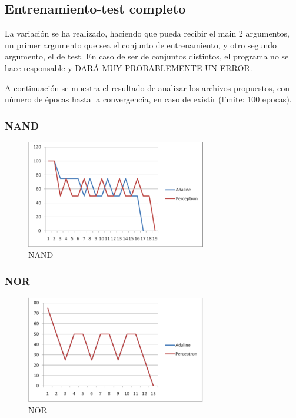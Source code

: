 \documentclass[12pt]{article}
\begin{document}
\subsection{Entrenamiento-test completo}
La variación se ha realizado, haciendo que pueda recibir el main 2 argumentos, un primer argumento que sea el conjunto de entrenamiento, y otro segundo argumento, el de test. En caso de ser de conjuntos distintos, el programa no se hace responsable y DARÁ MUY PROBABLEMENTE UN ERROR.

A continuación se muestra el resultado de analizar los archivos propuestos, con número de épocas hasta la convergencia, en caso de existir (límite: 100 epocas).

\newpage
\subsubsection*{NAND}
\begin{figure}[h!]
    \label{fig:fig3}
  \centering
       \includegraphics[width=0.7\textwidth]{recursos/fig3}
    \caption{NAND}
\end{figure} 



\subsubsection*{NOR}
\begin{figure}[h!]
    \label{fig:fig4}
  \centering
       \includegraphics[width=0.7\textwidth]{recursos/fig4}
    \caption{NOR}
\end{figure} 
\end{document}
